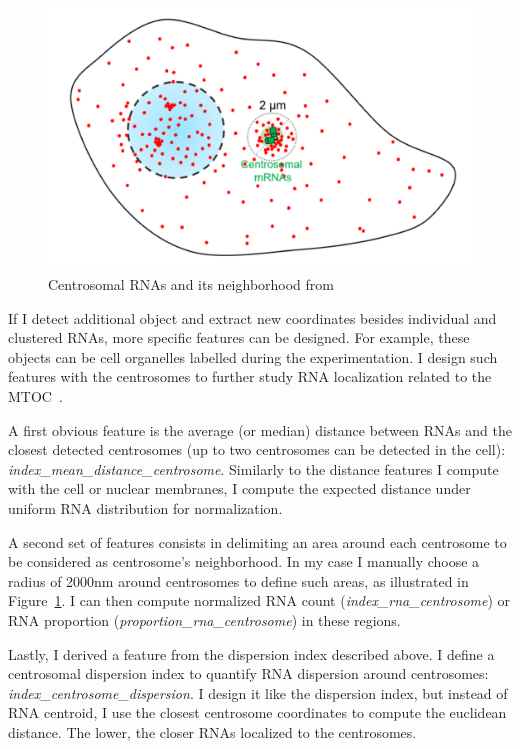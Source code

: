 \begin{figure}
	\begin{center}
	\includegraphics[width=\linewidth]{figures/chapter4/centrosomal_features}
	\caption[Centrosomal neighborhood]{Centrosomal RNAs and its neighborhood from~\cite{safieddine_choreography_2021}}
	\label{fig:centrosome_features}
	\end{center}
\end{figure}

If I detect additional object and extract new coordinates besides individual and clustered \ac{RNA}s, more specific features can be designed.
For example, these objects can be cell organelles labelled during the experimentation.
I design such features with the centrosomes to further study \ac{RNA} localization related to the \ac{MTOC}~\cite{safieddine_choreography_2021}.

A first obvious feature is the average (or median) distance between \ac{RNA}s and the closest detected centrosomes (up to two centrosomes can be detected in the cell): \emph{index\_mean\_distance\_centrosome}.
Similarly to the distance features I compute with the cell or nuclear membranes, I compute the expected distance under uniform \ac{RNA} distribution for normalization.

A second set of features consists in delimiting an area around each centrosome to be considered as centrosome's neighborhood.
In my case I manually choose a radius of 2000nm around centrosomes to define such areas, as illustrated in Figure~\ref{fig:centrosome_features}.
I can then compute normalized \ac{RNA} count (\emph{index\_rna\_centrosome}) or \ac{RNA} proportion (\emph{proportion\_rna\_centrosome}) in these regions.

Lastly, I derived a feature from the dispersion index described above.
I define a centrosomal dispersion index to quantify \ac{RNA} dispersion around centrosomes: \emph{index\_centrosome\_dispersion}.
I design it like the dispersion index, but instead of \ac{RNA} centroid, I use the closest centrosome coordinates to compute the euclidean distance.
The lower, the closer \ac{RNA}s localized to the centrosomes.

